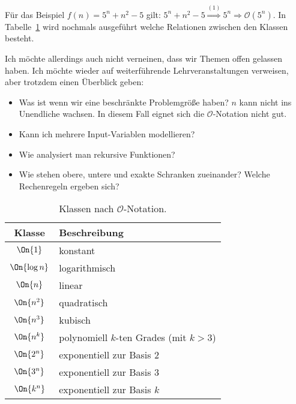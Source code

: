 Für das Beispiel $f(n) = 5^n + n^2 - 5$ gilt: $5^n + n^2 - 5 \stackrel{(1)}{\Rightarrow} 5^n  \Rightarrow \mathcal{O}(5^n)$. In Tabelle~\ref{tab:classes} wird nochmals ausgeführt welche Relationen zwischen den Klassen besteht.

Ich möchte allerdings auch nicht verneinen, dass wir Themen offen gelassen haben. Ich möchte wieder auf weiterführende Lehrveranstaltungen verweisen, aber trotzdem einen Überblick geben:
\begin{itemize}
  \item Was ist wenn wir eine beschränkte Problemgröße haben? $n$ kann nicht ins Unendliche wachsen. In diesem Fall eignet sich die $\mathcal{O}$-Notation nicht gut.
  \item Kann ich mehrere Input-Variablen modellieren?
  \item Wie analysiert man rekursive Funktionen?
  \item Wie stehen obere, untere und exakte Schranken zueinander? Welche Rechenregeln ergeben sich?
\end{itemize}
%
\begin{table}[ht]
 \begin{center}
  \begin{tabular}{cl}
   Klasse & Beschreibung \\
  \hline
   $\On{1}$ & konstant \\
   $\On{\log{n}}$ & logarithmisch \\
   $\On{n}$ & linear \\
   $\On{n^2}$ & quadratisch \\
   $\On{n^3}$ & kubisch \\
   $\On{n^k}$ & polynomiell $k$-ten Grades (mit $k>3$) \\
   $\On{2^n}$ & exponentiell zur Basis 2 \\
   $\On{3^n}$ & exponentiell zur Basis 3 \\
   $\On{k^n}$ & exponentiell zur Basis $k$ \\
  \end{tabular}
  \caption{Klassen nach $\mathcal{O}$-Notation.}
  \label{tab:classes}
 \end{center}
\end{table}

